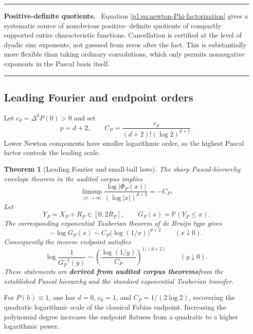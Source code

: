 \documentclass[11pt,oneside]{article}
\numberwithin{equation}{section}
\newtheorem{theorem}{Theorem}[section]
\theoremstyle{definition}
\theoremstyle{remark}
\newcommand{\Prob}{\mathbb P}
\newcommand{\statusderived}{\textcolor{linkblue}{\textbf{derived from audited corpus theorems}}}
\newenvironment{resultbox}[1]{%
  \par\medskip\noindent\begin{center}\begin{minipage}{0.94\textwidth}%
  \color{deepgreen}\hrule\vspace{0.65em}%
  \color{black}\textbf{\color{deepgreen}#1.}\ }{%
  \par\vspace{0.65em}\color{deepgreen}\hrule
  \end{minipage}\end{center}\medskip}
\begin{document}
\begin{resultbox}{Positive-definite quotients}
Equation \eqref{p1:eq:newton-Phi-factorization} gives a systematic source of nonobvious positive-
definite quotients of compactly supported entire characteristic functions.  Cancellation is
certified at the level of dyadic sinc exponents, not guessed from zeros after the fact.  This
is substantially more flexible than taking ordinary convolutions, which only permits
nonnegative exponents in the Pascal basis itself.
\end{resultbox}

\subsection{Leading Fourier and endpoint orders}

Let $c_d=\Delta^dP(0)>0$ and set
\begin{equation}
 p=d+2,
 \qquad
 C_P=\frac{c_d}{(d+2)!(\log2)^{d+1}}.
 \label{p1:eq:CP}
\end{equation}
Lower Newton components have smaller logarithmic order, so the highest Pascal factor controls
the leading scale.

\begin{theorem}[Leading Fourier and small-ball laws]
\label{p1:thm:leading-laws}
The sharp Pascal-hierarchy envelope theorem in the audited corpus implies
\begin{equation}
 \limsup_{|x|\to\infty}
 \frac{\log|\Phi_P(x)|}{(\log|x|)^{d+2}}
 =-C_P.
 \label{p1:eq:fourier-leading-P}
\end{equation}
Let
\[
 Y_P=X_P+R_P\in[0,2R_P],
 \qquad
 G_P(x)=\Prob(Y_P\le x).
\]
The corresponding exponential Tauberian theorem of de Bruijn type
\cite{p1:debruijn1959,p1:voss2009} gives
\begin{equation}
 -\log G_P(x)
 \sim C_P\bigl(\log(1/x)\bigr)^{d+2}
 \qquad(x\downarrow0).
 \label{p1:eq:smallball-leading-P}
\end{equation}
Consequently the inverse endpoint satisfies
\begin{equation}
 \boxed{
 \log\frac1{G_P^{-1}(y)}
 \sim
 \left(\frac{\log(1/y)}{C_P}\right)^{1/(d+2)}
 \qquad(y\downarrow0).}
 \label{p1:eq:inverse-leading-P}
\end{equation}
These statements are \statusderived from the established Pascal hierarchy and the standard
exponential Tauberian transfer.
\end{theorem}

\begin{remark}
For $P(h)\equiv1$, one has $d=0$, $c_0=1$, and
$C_P=1/(2\log2)$, recovering the quadratic logarithmic scale of the classical Fabius
endpoint.  Increasing the polynomial degree increases the endpoint flatness from a quadratic
to a higher logarithmic power.
\end{remark}
\end{document}
